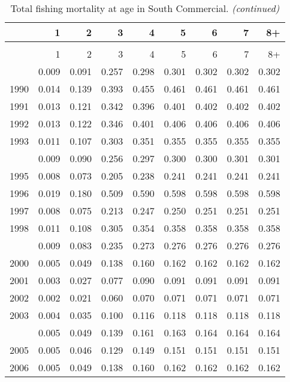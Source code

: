 \documentclass[
]{article}
\begin{document}
\begin{longtable}[t]{lrrrrrrrr}
\caption{\label{tab:South_Commercial-fleet-FAA-table}Total fishing mortality at age in South Commercial.}\\
\toprule
  & 1 & 2 & 3 & 4 & 5 & 6 & 7 & 8+\\
\midrule
\endfirsthead
\caption[]{Total fishing mortality at age in South Commercial. \textit{(continued)}}\\
\toprule
  & 1 & 2 & 3 & 4 & 5 & 6 & 7 & 8+\\
\midrule
\endhead

\endfoot
\bottomrule
\endlastfoot
1989 & 0.009 & 0.091 & 0.257 & 0.298 & 0.301 & 0.302 & 0.302 & 0.302\\
1990 & 0.014 & 0.139 & 0.393 & 0.455 & 0.461 & 0.461 & 0.461 & 0.461\\
1991 & 0.013 & 0.121 & 0.342 & 0.396 & 0.401 & 0.402 & 0.402 & 0.402\\
1992 & 0.013 & 0.122 & 0.346 & 0.401 & 0.406 & 0.406 & 0.406 & 0.406\\
1993 & 0.011 & 0.107 & 0.303 & 0.351 & 0.355 & 0.355 & 0.355 & 0.355\\
\addlinespace
1994 & 0.009 & 0.090 & 0.256 & 0.297 & 0.300 & 0.300 & 0.301 & 0.301\\
1995 & 0.008 & 0.073 & 0.205 & 0.238 & 0.241 & 0.241 & 0.241 & 0.241\\
1996 & 0.019 & 0.180 & 0.509 & 0.590 & 0.598 & 0.598 & 0.598 & 0.598\\
1997 & 0.008 & 0.075 & 0.213 & 0.247 & 0.250 & 0.251 & 0.251 & 0.251\\
1998 & 0.011 & 0.108 & 0.305 & 0.354 & 0.358 & 0.358 & 0.358 & 0.358\\
\addlinespace
1999 & 0.009 & 0.083 & 0.235 & 0.273 & 0.276 & 0.276 & 0.276 & 0.276\\
2000 & 0.005 & 0.049 & 0.138 & 0.160 & 0.162 & 0.162 & 0.162 & 0.162\\
2001 & 0.003 & 0.027 & 0.077 & 0.090 & 0.091 & 0.091 & 0.091 & 0.091\\
2002 & 0.002 & 0.021 & 0.060 & 0.070 & 0.071 & 0.071 & 0.071 & 0.071\\
2003 & 0.004 & 0.035 & 0.100 & 0.116 & 0.118 & 0.118 & 0.118 & 0.118\\
\addlinespace
2004 & 0.005 & 0.049 & 0.139 & 0.161 & 0.163 & 0.164 & 0.164 & 0.164\\
2005 & 0.005 & 0.046 & 0.129 & 0.149 & 0.151 & 0.151 & 0.151 & 0.151\\
2006 & 0.005 & 0.049 & 0.138 & 0.160 & 0.162 & 0.162 & 0.162 & 0.162\\

\end{longtable}
\end{document}
